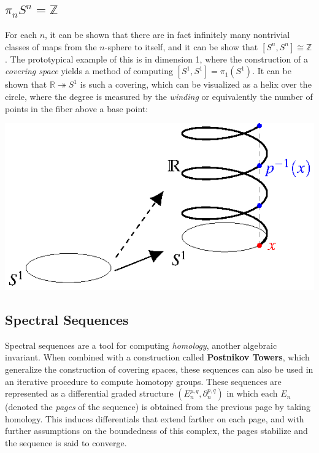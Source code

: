 \documentclass[a0,final]{a0poster}
\begin{document}
\begin{multicols}{3}
\subsection*{$\pi_{n} S^n = \mathbb{Z}$}

For each $n$, it can be shown that there are in fact infinitely many nontrivial classes of maps from the $n$-sphere to itself, and it can be show that $[S^n, S^n] \cong \mathbb{Z}$. The prototypical example of this is in dimension 1, where the construction of a \textit{covering space} yields a method of computing $[S^1, S^1] = \pi_1(S^1)$. It can be shown that $\mathbb{R} \twoheadrightarrow S^1$ is such a covering, which can be visualized as a helix over the circle, where the degree is measured by the \textit{winding} or equivalently the number of points in the fiber above a base point:


\begin{center}
\includegraphics[width=20cm]{helix}
\end{center}
 

\subsection*{Spectral Sequences}
Spectral sequences are a tool for computing \textit{homology}, another algebraic invariant. When combined with a construction called \textbf{Postnikov Towers}, which generalize the construction of covering spaces, these sequences can also be used in an iterative procedure to compute homotopy groups. These sequences are represented as a differential graded structure $(E_n^{p,q}, \partial_n^{p,q})$ in which each $E_n$ (denoted the \textit{pages} of the sequence) is obtained from the previous page by taking homology. This induces differentials that extend farther on each page, and with further assumptions on the boundedness of this complex, the pages stabilize and the sequence is said to converge.



\end{multicols}
\end{document}
